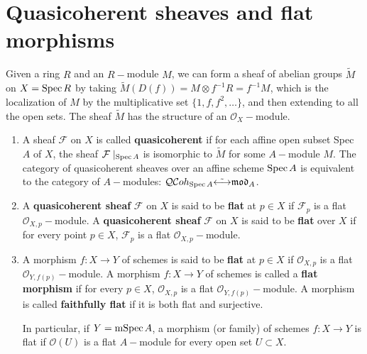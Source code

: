 \documentclass[12pt]{article}
\theoremstyle{mytheoremstyle}
\newcommand{\cO}{\mathcal{O}}
\newcommand{\cF}{\mathcal{F}}
\newcommand{\spec}{\text{Spec\hspace*{.5mm}}}
\newcommand{\mspec}{\text{mSpec\hspace*{.5mm}}}
\begin{document}
\section{Quasicoherent sheaves and flat morphisms}
\hspace*{8mm}Given a ring $R$ and an 
$R-$module $M$, we can form a sheaf of abelian
groups $\widetilde{M}$ on $X= \spec R$ by taking $\widetilde{M}(D(f))
= M\otimes f^{-1}R = f^{-1}M$, which is the localization of $M$ by the
multiplicative set $\{1,f,f^2,\ldots\}$, and then extending to
all the open sets. The sheaf $\widetilde{M}$
has the structure of an $\cO_X-$module.

\begin{enumerate}

    \item A sheaf $\cF$ on $X$ is called \textbf{quasicoherent} if for each affine
        open subset Spec $A$ of $X$, the sheaf $\cF\mid_{\spec A}$
        is isomorphic to $\widetilde{M}$ for some $A-$module $M$.
        The category of quasicoherent sheaves over an affine
        scheme $\spec A$ is equivalent to the category of $A-$modules:
        $\mathcal{QC}oh_{\spec A} \tilde{\longleftrightarrow}
        \mathfrak{mod}_A$.
    
    \item A \textbf{quasicoherent sheaf} $\cF$ on $X$ is said to be
        \textbf{flat} at $p\in X$
        if $\cF_p$ is a flat $\cO_{X,p}-$module.
        A \textbf{quasicoherent sheaf} $\cF$ on $X$ is said to be
        \textbf{flat} over $X$
        if for every point $p\in X$, $\cF_p$ is a flat
        $\cO_{X,p}-$module.

    \item A morphism $f:X\to Y$ of schemes is said to be \textbf{flat}
        at $p\in X$ if $\cO_{X,p}$ is a flat
        $\cO_{Y,f(p)}-$module.
        A morphism $f:X\to Y$ of schemes is called a \textbf{flat
        morphism} if for every $p\in X$, $\cO_{X,p}$ is a flat
        $\cO_{Y,f(p)}-$module.
        A morphism is called \textbf{faithfully flat} if it is both
        flat and surjective.

        In particular, if $Y=\mspec A$, a morphism (or family)
        of schemes
        $f:X\to Y$ is flat if $\cO(U)$ is a flat $A-$module for every
        open set $U\subset X$.

\end{enumerate}
\end{document}
